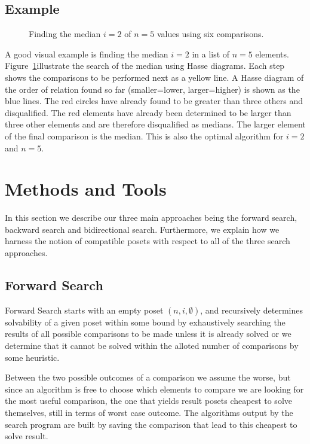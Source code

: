 \documentclass[10pt,journal,compsoc]{IEEEtran}
\begin{document}
\subsection{Example}
\begin{figure}[!b]
  \centering
  
  \caption{Finding the median $i = 2$ of $n = 5$ values using six comparisons.}
  \label{fig:median_of_5}
\end{figure}
A good visual example is finding the median $i=2$ in a list of $n = 5$ elements.
Figure~\ref{fig:median_of_5}illustrate the search of the median using Hasse diagrams.
Each step shows the comparisons to be performed next as a yellow line.
A Hasse diagram of the order of relation found so far (smaller=lower, larger=higher) is shown as the blue lines.
The red circles have already found to be greater than three others and disqualified.
The red elements have already been determined to be larger than three other elements and are therefore disqualified as medians.
The larger element of the final comparison is the median.
This is also the optimal algorithm for $i = 2$ and $n = 5$.


\section{Methods and Tools}
In this section we describe our three main approaches being the forward search, backward search and bidirectional search.
Furthermore, we explain how we harness the notion of compatible posets with respect to all of the three search approaches.

\subsection{Forward Search}\label{chapter:forward_search}
Forward Search starts with an empty poset $(n,i,\emptyset)$, and recursively determines solvability of a given poset within some bound by exhaustively searching the results of all possible comparisons to be made unless it is already solved or we determine that it cannot be solved within the alloted number of comparisons by some heuristic.

Between the two possible outcomes of a comparison we assume the worse, but since an algorithm is free to choose which elements to compare we are looking for the most useful comparison, the one that yields result posets cheapest to solve themselves, still in terms of worst case outcome.
The algorithms output by the search program are built by saving the comparison that lead to this cheapest to solve result.
\end{document}
